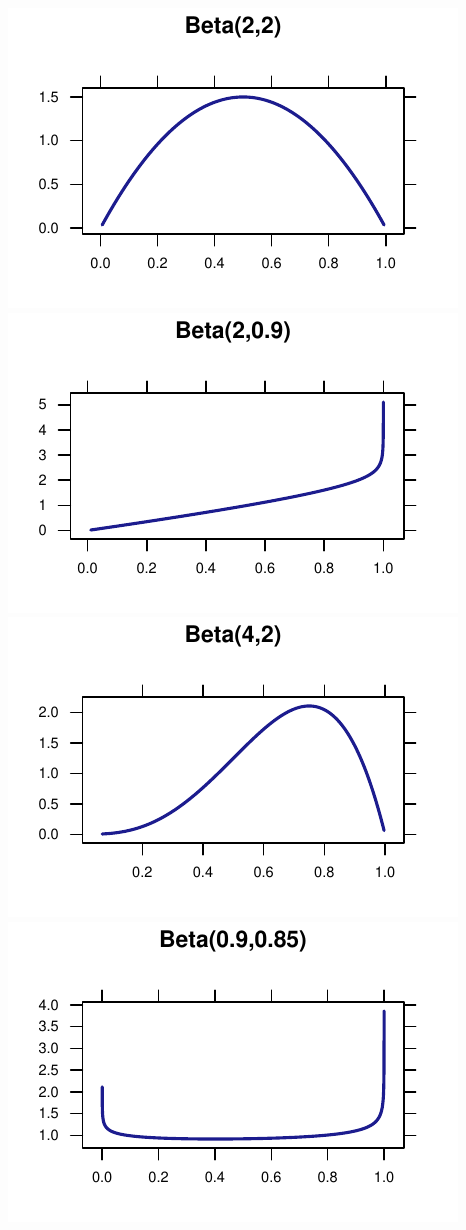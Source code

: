 \documentclass[twoside]{book}\usepackage[]{graphicx}\usepackage[]{xcolor}
\makeatletter
\def\maxwidth{ %
  \ifdim\Gin@nat@width>\linewidth
    \linewidth
  \else
    \Gin@nat@width
  \fi
}
\newenvironment{knitrout}{}{} %
\makeatother
\begin{document}
\begin{knitrout}
{\centering \includegraphics[width=\maxwidth]{figures/fig-unnamed-chunk-88-1} 
\includegraphics[width=\maxwidth]{figures/fig-unnamed-chunk-88-2} 
\includegraphics[width=\maxwidth]{figures/fig-unnamed-chunk-88-3} 
\includegraphics[width=\maxwidth]{figures/fig-unnamed-chunk-88-4} 

}
\end{knitrout}
\end{document}
